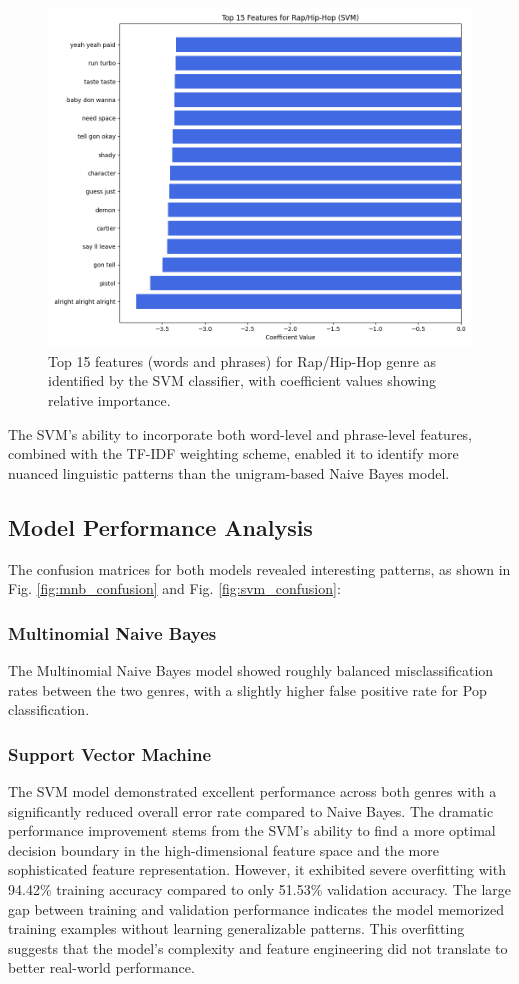 \documentclass[conference]{IEEEtran}
\begin{document}
\begin{figure}[htbp]
\centerline{\includegraphics[width=0.9\columnwidth]{plots/svm_top_features_rap_hip-hop.png}}
\caption{Top 15 features (words and phrases) for Rap/Hip-Hop genre as identified by the SVM classifier, with coefficient values showing relative importance.}
\label{fig:rap_features}
\end{figure}

The SVM's ability to incorporate both word-level and phrase-level features, combined with the TF-IDF weighting scheme, enabled it to identify more nuanced linguistic patterns than the unigram-based Naive Bayes model.

\subsection{Model Performance Analysis}
The confusion matrices for both models revealed interesting patterns, as shown in Fig. \ref{fig:mnb_confusion} and Fig. \ref{fig:svm_confusion}:

\subsubsection{Multinomial Naive Bayes}
The Multinomial Naive Bayes model showed roughly balanced misclassification rates between the two genres, with a slightly higher false positive rate for Pop classification.

\subsubsection{Support Vector Machine}
The SVM model demonstrated excellent performance across both genres with a significantly reduced overall error rate compared to Naive Bayes. The dramatic performance improvement stems from the SVM's ability to find a more optimal decision boundary in the high-dimensional feature space and the more sophisticated feature representation. However, it exhibited severe overfitting with 94.42\% training accuracy compared to only 51.53\% validation accuracy. The large gap between training and validation performance indicates the model memorized training examples without learning generalizable patterns. This overfitting suggests that the model's complexity and feature engineering did not translate to better real-world performance.
\end{document}
